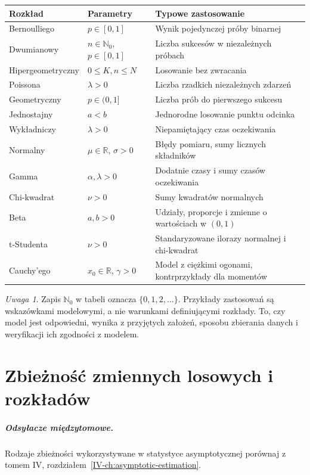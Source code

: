 \documentclass[11pt,a4paper,oneside]{report}
\numberwithin{equation}{chapter}
\theoremstyle{plain}
\theoremstyle{definition}
\theoremstyle{remark}
\newtheorem{uwaga}{Uwaga}[chapter]
\newcommand{\R}{\mathbb{R}}
\newcommand{\N}{\mathbb{N}}
\begin{document}
\begin{center}
\small
\begin{tabular}{@{}p{3.0cm}p{4.1cm}p{5.9cm}@{}}
\hline
Rozkład & Parametry & Typowe zastosowanie \\
\hline
Bernoulliego & $p\in[0,1]$ & Wynik pojedynczej próby binarnej \\
Dwumianowy & $n\in\N_0$, $p\in[0,1]$ & Liczba sukcesów w niezależnych próbach \\
Hipergeometryczny & $0\leq K,n\leq N$ & Losowanie bez zwracania \\
Poissona & $\lambda>0$ & Liczba rzadkich niezależnych zdarzeń \\
Geometryczny & $p\in(0,1]$ & Liczba prób do pierwszego sukcesu \\
Jednostajny & $a<b$ & Jednorodne losowanie punktu odcinka \\
Wykładniczy & $\lambda>0$ & Niepamiętający czas oczekiwania \\
Normalny & $\mu\in\R$, $\sigma>0$ & Błędy pomiaru, sumy licznych składników \\
Gamma & $\alpha,\lambda>0$ & Dodatnie czasy i sumy czasów oczekiwania \\
Chi-kwadrat & $\nu>0$ & Sumy kwadratów normalnych \\
Beta & $a,b>0$ & Udziały, proporcje i zmienne o wartościach w $(0,1)$ \\
t-Studenta & $\nu>0$ & Standaryzowane ilorazy normalnej i chi-kwadrat \\
Cauchy'ego & $x_0\in\R$, $\gamma>0$ & Model z ciężkimi ogonami, kontrprzykłady dla momentów \\
\hline
\end{tabular}
\end{center}

\begin{uwaga}
Zapis $\N_0$ w tabeli oznacza $\{0,1,2,\ldots\}$.
Przykłady zastosowań są wskazówkami modelowymi, a nie
warunkami definiującymi rozkłady. To, czy model jest odpowiedni,
wynika z przyjętych założeń, sposobu zbierania danych
i weryfikacji ich zgodności z modelem.
\end{uwaga}

\chapter{Zbieżność zmiennych losowych i rozkładów}
\label{ch:convergence}
\paragraph{Odsyłacze międzytomowe.} Rodzaje zbieżności wykorzystywane w statystyce asymptotycznej porównaj z tomem IV, rozdziałem~\ref{IV-ch:asymptotic-estimation}.
\end{document}
